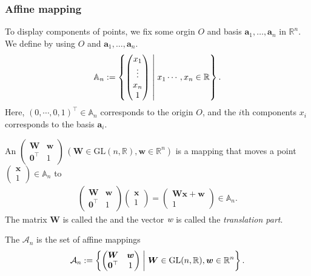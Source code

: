 \subsubsection{Affine mapping}

To display components of points, we fix some orgin $O$ and basis $\bm{a}_{1}, \dots, \bm{a}_{n}$ in $\mathbb{R}^{n}$.
We define  by using $O$ and $\bm{a}_{1}, \dots, \bm{a}_{n}$.
\begin{align}
  \mathbb{A}_{n} := \left\{  \begin{pmatrix} x_{1} \\ \vdots \\ x_{n} \\ 1 \end{pmatrix}  \mathrel{}\middle|\mathrel{}  x_{1} \cdots, x_{n} \in \mathbb{R}  \right\}.
\end{align}
Here, $(0, \cdots, 0, 1)^{\top} \in \mathbb{A}_{n}$ corresponds to the origin $O$, and the $i$th components $x_{i}$ corresponds to the basis $\bm{a}_{i}$.

\begin{screen}
  \begin{definition}
    An  $\begin{pmatrix} \bm{W} & \bm{w} \\ \bm{0}^{\top} & 1 \end{pmatrix} \,( \bm{W} \in \mathrm{GL}(n, \mathbb{R}), \bm{w} \in \mathbb{R}^{n} ) $ is a mapping that moves a point $ \begin{pmatrix} \bm{x} \\ 1 \end{pmatrix} \in \mathbb{A}_{n}$ to
      \begin{align}
        \begin{pmatrix} \bm{W} & \bm{w} \\ \bm{0}^{\top} & 1 \end{pmatrix} \begin{pmatrix} \bm{x} \\ 1 \end{pmatrix}
          = \begin{pmatrix} \bm{Wx} + \bm{w} \\ 1 \end{pmatrix} \in \mathbb{A}_{n}.
      \end{align}
    The matrix $\bm{W}$ is called the  and the vector $\textit{w}$ is called the \textit{translation part}.

    The  $\mathcal{A}_{n}$ is the set of affine mappings
    \begin{align}
      \mathcal{A}_{n} := \left\{  \begin{pmatrix} \bm{W} & \bm{w} \\ \bm{0}^{\top} & 1 \end{pmatrix}  \mathrel{}\middle|\mathrel{}  \bm{W} \in \mathrm{GL}(n, \mathbb{R}), \bm{w} \in \mathbb{R}^{n}  \right\}.
    \end{align}
  \end{definition}
\end{screen}

